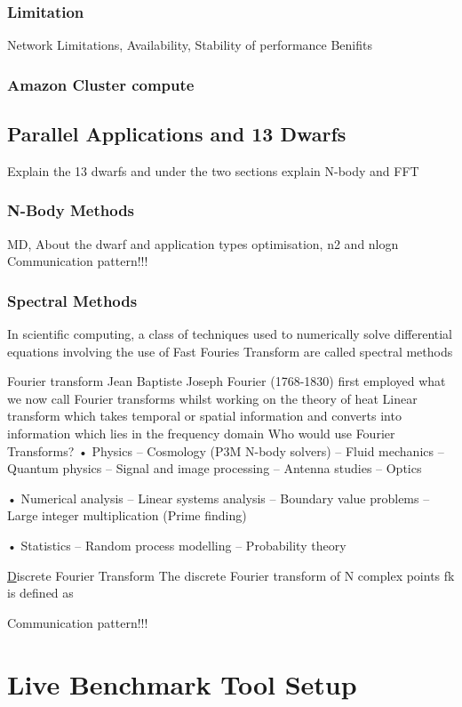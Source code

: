 \documentclass[12pt,a4paper]{report}
\begin{document}
\subsection{Limitation}
Network Limitations, Availability, Stability of performance
Benifits
\subsection{Amazon Cluster compute}

\section{Parallel Applications and 13 Dwarfs}
Explain the 13 dwarfs and under the two sections explain N-body and FFT

\subsection{N-Body Methods}
MD, About the dwarf and application types optimisation, n2 and nlogn
Communication pattern!!!




\subsection{Spectral Methods}
In scientific computing, a class of techniques used to numerically solve differential equations involving the use of Fast Fouries Transform are called spectral methods

Fourier transform
Jean Baptiste Joseph Fourier (1768-1830) first employed what we now call Fourier transforms whilst working on the theory of heat 
Linear transform which takes temporal or spatial information and converts into information which lies in the frequency domain
Who would use Fourier Transforms? 
• Physics 
– Cosmology (P3M N-body solvers) 
– Fluid mechanics 
– Quantum physics 
– Signal and image processing 
– Antenna studies 
– Optics 

• Numerical analysis 
– Linear systems analysis 
– Boundary value problems 
– Large integer multiplication (Prime finding) 

• Statistics 
– Random process modelling 
– Probability theory

{\underline Discrete Fourier Transform}
The discrete Fourier transform of N complex points fk is defined as 


Communication pattern!!!




\chapter{Live Benchmark Tool Setup}
\end{document}
